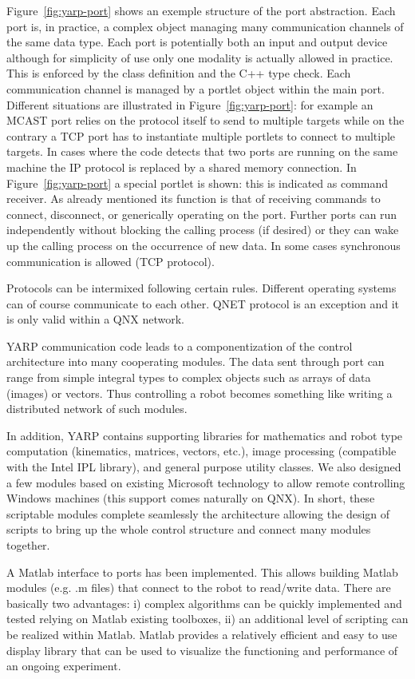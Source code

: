 Figure~\ref{fig:yarp-port} shows an exemple structure of the port
abstraction. Each port is, in practice, a complex object managing many
communication channels of the same data type. Each port is potentially
both an input and output device although for simplicity of use only
one modality is actually allowed in practice. This is enforced by the
class definition and the C++ type check. Each communication channel is
managed by a portlet object within the main port. Different situations
are illustrated in Figure~\ref{fig:yarp-port}: for example an MCAST
port relies on the protocol itself to send to multiple targets while
on the contrary a TCP port has to instantiate multiple portlets to
connect to multiple targets. In cases where the code detects that two
ports are running on the same machine the IP protocol is replaced by a
shared memory connection. In Figure~\ref{fig:yarp-port} a special
portlet is shown: this is indicated as command receiver. As already
mentioned its function is that of receiving commands to connect,
disconnect, or generically operating on the port. Further ports can
run independently without blocking the calling process (if desired) or
they can wake up the calling process on the occurrence of new data. In
some cases synchronous communication is allowed (TCP protocol).

Protocols can be intermixed following certain rules. Different
operating systems can of course communicate to each other. QNET
protocol is an exception and it is only valid within a QNX network.

YARP communication code leads to a componentization of the control
architecture into many cooperating modules. The data sent through port
can range from simple integral types to complex objects such as arrays
of data (images) or vectors. Thus controlling a robot becomes
something like writing a distributed network of such modules.

In addition, YARP contains supporting libraries for mathematics and
robot type computation (kinematics, matrices, vectors, etc.), image
processing (compatible with the Intel IPL library), and general
purpose utility classes. We also designed a few modules based on
existing Microsoft technology to allow remote controlling Windows
machines (this support comes naturally on QNX). In short, these
scriptable modules complete seamlessly the architecture allowing the
design of scripts to bring up the whole control structure and connect
many modules together.

A Matlab interface to ports has been implemented. This allows building
Matlab modules (e.g. .m files) that connect to the robot to read/write
data. There are basically two advantages: i) complex algorithms can be
quickly implemented and tested relying on Matlab existing toolboxes,
ii) an additional level of scripting can be realized within
Matlab. Matlab provides a relatively efficient and easy to use display
library that can be used to visualize the functioning and performance
of an ongoing experiment.

